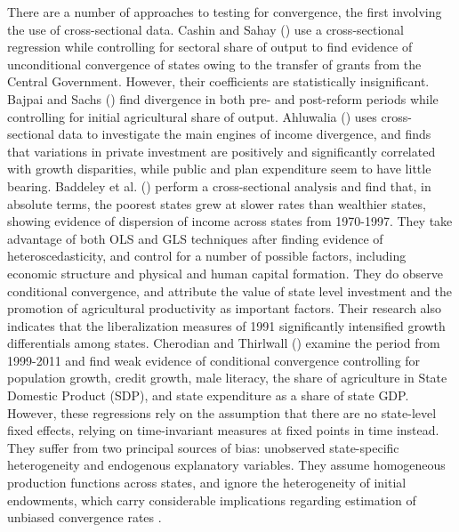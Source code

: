 \documentclass[a4paper, 11pt]{article}
\begin{document}
There are a number of approaches to testing for convergence, the first involving the use of cross-sectional data.  Cashin and Sahay (\citeyear{cashin_internal_1996}) use a cross-sectional regression while controlling for sectoral share of output to find evidence of unconditional convergence of states owing to the transfer of grants from the Central Government.  However, their coefficients are statistically insignificant.  Bajpai and Sachs (\citeyear{bajpai_trends_1996}) find divergence in both pre- and post-reform periods while controlling for initial agricultural share of output.  Ahluwalia (\citeyear{ahluwalia_state-level_2000}) uses cross-sectional data to investigate the main engines of income divergence, and finds that variations in private investment are positively and significantly correlated with growth disparities, while public and plan expenditure seem to have little bearing.  Baddeley et al. (\citeyear{baddeley_divergence_2006}) perform a cross-sectional analysis and find that, in absolute terms, the poorest states grew at slower rates than wealthier states, showing evidence of dispersion of income across states from 1970-1997.  They take advantage of both OLS and GLS techniques after finding evidence of heteroscedasticity, and control for a number of possible factors, including economic structure and physical and human capital formation.  They do observe conditional convergence, and attribute the value of state level investment and the promotion of agricultural productivity as important factors.  Their research also indicates that the liberalization measures of 1991 significantly intensified growth differentials among states.  Cherodian and Thirlwall (\citeyear{cherodian_regional_2015}) examine the period from 1999-2011 and find weak evidence of conditional convergence controlling for population growth, credit growth, male literacy, the share of agriculture in State Domestic Product (SDP), and state expenditure as a share of state GDP.  However, these regressions rely on the assumption that there are no state-level fixed effects, relying on time-invariant measures at fixed points in time instead.  They suffer from two principal sources of bias: unobserved state-specific heterogeneity and endogenous explanatory variables.  They assume homogeneous production functions across states, and ignore the heterogeneity of initial endowments, which carry considerable implications regarding estimation of unbiased convergence rates \citep{weeks2003provincial}. \par
\end{document}
